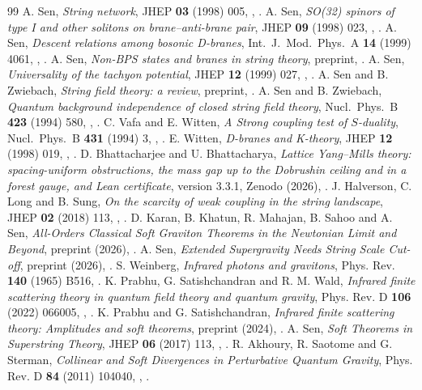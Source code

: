 \begin{thebibliography}{99}
 A. Sen, \emph{String network}, JHEP \textbf{03} (1998) 005, , .
 A. Sen, \emph{SO(32) spinors of type I and other solitons on brane--anti-brane pair}, JHEP \textbf{09} (1998) 023, , .
 A. Sen, \emph{Descent relations among bosonic D-branes}, Int.\ J.\ Mod.\ Phys.\ A \textbf{14} (1999) 4061, , .
 A. Sen, \emph{Non-BPS states and branes in string theory}, preprint, .
 A. Sen, \emph{Universality of the tachyon potential}, JHEP \textbf{12} (1999) 027, , .
 A. Sen and B. Zwiebach, \emph{String field theory: a review}, preprint, .
 A. Sen and B. Zwiebach, \emph{Quantum background independence of closed string field theory}, Nucl.\ Phys.\ B \textbf{423} (1994) 580, , .
 C. Vafa and E. Witten, \emph{A Strong coupling test of $S$-duality}, Nucl.\ Phys.\ B \textbf{431} (1994) 3, , .
 E. Witten, \emph{D-branes and K-theory}, JHEP \textbf{12} (1998) 019, , .
 D. Bhattacharjee and U. Bhattacharya, \emph{Lattice Yang--Mills theory: spacing-uniform obstructions, the mass gap up to the Dobrushin ceiling and in a forest gauge, and Lean certificate}, version 3.3.1, Zenodo (2026), .
 J. Halverson, C. Long and B. Sung, \emph{On the scarcity of weak coupling in the string landscape}, JHEP \textbf{02} (2018) 113, , .
 D. Karan, B. Khatun, R. Mahajan, B. Sahoo and A. Sen, \emph{All-Orders Classical Soft Graviton Theorems in the Newtonian Limit and Beyond}, preprint (2026), .
 A. Sen, \emph{Extended Supergravity Needs String Scale Cut-off}, preprint (2026), .
 S. Weinberg, \emph{Infrared photons and gravitons}, Phys. Rev. \textbf{140} (1965) B516, .
 K. Prabhu, G. Satishchandran and R. M. Wald, \emph{Infrared finite scattering theory in quantum field theory and quantum gravity}, Phys. Rev. D \textbf{106} (2022) 066005, , .
 K. Prabhu and G. Satishchandran, \emph{Infrared finite scattering theory: Amplitudes and soft theorems}, preprint (2024), .
 A. Sen, \emph{Soft Theorems in Superstring Theory}, JHEP \textbf{06} (2017) 113, , .
 R. Akhoury, R. Saotome and G. Sterman, \emph{Collinear and Soft Divergences in Perturbative Quantum Gravity}, Phys. Rev. D \textbf{84} (2011) 104040, , .
\end{thebibliography}
